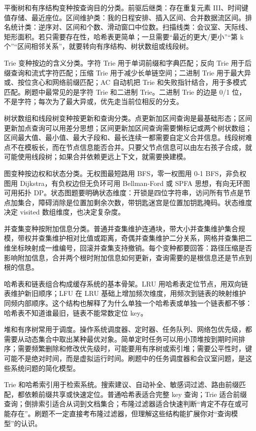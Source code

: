 平衡树和有序结构变种按查询目的分类。前驱后继类：存在重复元素 III、时间键值存储、最近座位。区间维护类：我的日程安排、插入区间、合并数据流区间。排名统计类：逆序对、区间和个数、滑动窗口中位数。扫描线类：会议室、天际线、矩形面积。若只需要存在性，哈希表更简单；一旦需要“最近的更大/更小”“第 k 个”“区间相邻关系”，就要转向有序结构、树状数组或线段树。

Trie 变种按边的含义分类。字符 Trie 用于单词前缀和字典匹配；反向 Trie 用于后缀查询和流式字符匹配；压缩 Trie 用于减少长单链空间；二进制 Trie 用于最大异或、按位贪心和网络前缀匹配；AC 自动机把 Trie 和失败指针结合，用于多模式匹配。刷题中最常见的是字符 Trie 和二进制 Trie。二进制 Trie 的边是 0/1 位，不是字符；每次为了最大异或，优先走当前位相反的分支。

树状数组和线段树变种按更新和查询分类。点更新加区间查询是最基础形态；区间更新加点查询可以用差分思想；区间更新加区间查询需要懒标记或两个树状数组；区间最大值、最小值、最大子段和、最长连续一都需要自定义合并信息。线段树难点不在模板长，而在节点信息能否合并。只要父节点信息可以由左右孩子合成，就可能使用线段树；如果合并依赖更远上下文，就需要换建模。

图变种按边权和状态分类。无权图最短路用 BFS，零一权图用 0-1 BFS，非负权图用 Dijkstra，有负权边但无负环可用 Bellman-Ford 或 SPFA 思想，有向无环图可用拓扑 DP。状态图题要明确状态维度：开锁是四位字符串，访问所有节点是节点加集合，障碍消除是位置加剩余次数，带钥匙迷宫是位置加钥匙掩码。状态维度决定 visited 数组维度，也决定复杂度。

并查集变种按附加信息分类。普通并查集维护连通块，带大小并查集维护集合规模，带权并查集维护相对比值或距离，奇偶并查集维护二分关系，网格并查集把二维坐标映射成一维编号，回滚并查集支持撤销。每个变种都要回答：路径压缩是否影响附加信息，合并两个根时附加信息如何更新，查询需要的是根信息还是节点到根的信息。


哈希表和链表组合构成缓存系统的基本骨架。LRU 用哈希表定位节点，用双向链表维护新旧顺序；LFU 在 LRU 基础上增加频次维度，用频次到链表的映射维护同频内部顺序。这个结构也解释了为什么单独一个哈希表或单独一个链表都不够：哈希表不知道谁最旧，链表不能常数定位 key。

堆和有序树常用于调度。操作系统调度器、定时器、任务队列、网络包优先级，都需要从动态集合中取出某种最优对象。简单定时任务可以用小顶堆按到期时间排序；需要频繁删除和修改优先级时，可能要用有序树或索引堆；需要公平性时，键可能不是绝对时间，而是虚拟运行时间。刷题中的任务调度器和会议室问题，是这些系统问题的简化模型。

Trie 和哈希索引用于检索系统。搜索建议、自动补全、敏感词过滤、路由前缀匹配，都依赖前缀共享或快速定位。普通哈希表适合完整 key 查询；Trie 适合前缀查询；倒排索引适合从词到文档集合；布隆过滤器适合快速判断“肯定不存在或可能存在”。刷题不一定直接考布隆过滤器，但理解这些结构能扩展你对“查询模型”的认识。

